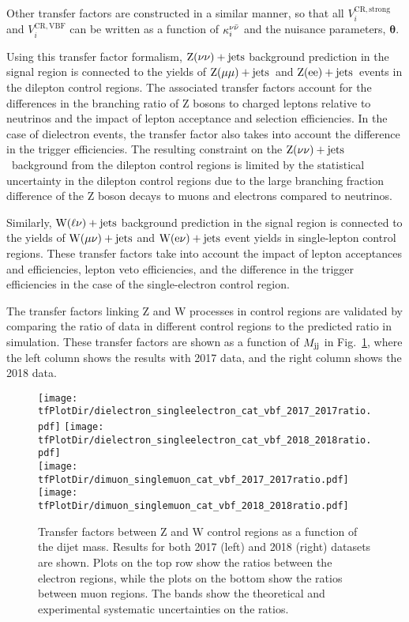 Other transfer factors are constructed in a similar manner, so that all $V_{i}^{\mathrm{CR,strong}}$ and
$V_{i}^{\mathrm{CR,VBF}}$ can be written as a function of $\kappa_{i}^{\nu\bar{\nu}}$ and the nuisance parameters, $\boldsymbol{\theta}$. 

Using this transfer factor formalism, $\textrm{Z}(\nu\nu)+\textrm{jets}$ background prediction in the signal region is connected 
to the yields of $\mathrm{Z}(\mu\mu)+\textrm{jets}$~and $\mathrm{Z}(\textrm{ee})+\textrm{jets}$~events
in the dilepton control regions. The associated transfer factors account for the differences in the
branching ratio of Z bosons to charged leptons relative to neutrinos and the impact of lepton acceptance and selection
efficiencies. In the case of dielectron events, the transfer factor also takes into account the
difference in the trigger efficiencies. The resulting constraint on the $\textrm{Z}(\nu\nu)+\textrm{jets}$~background from the dilepton
control regions is limited by the statistical uncertainty in the dilepton control regions due to the large
branching fraction difference of the Z boson decays to muons and electrons compared to neutrinos.

Similarly, $\textrm{W}(\ell\nu)+\textrm{jets}$ background prediction in the signal region is connected to the yields of
$\textrm{W}(\mu\nu)+\textrm{jets}$ and $\textrm{W}(\textrm{e}\nu)+\textrm{jets}$ event yields in single-lepton control regions.
These transfer factors take into account
the impact of lepton acceptances and efficiencies, lepton veto efficiencies, and
the difference in the trigger efficiencies in the case of the single-electron control region.

The transfer factors linking Z and W processes in control regions are validated by comparing the ratio of data in
different control regions to the predicted ratio in simulation. These transfer factors are shown as a function of $M_{\textrm{jj}}$
in Fig.~\ref{fig:transfer_factors_zoverw}, where the left column shows the results with 2017 data, and the right column
shows the 2018 data. 

\begin{figure}[htbp]
  \centering
    \texttt{[image: \\tfPlotDir/dielectron\_singleelectron\_cat\_vbf\_2017\_2017ratio.pdf]}
    \texttt{[image: \\tfPlotDir/dielectron\_singleelectron\_cat\_vbf\_2018\_2018ratio.pdf]} \\
    \texttt{[image: \\tfPlotDir/dimuon\_singlemuon\_cat\_vbf\_2017\_2017ratio.pdf]}
    \texttt{[image: \\tfPlotDir/dimuon\_singlemuon\_cat\_vbf\_2018\_2018ratio.pdf]}
  \caption{Transfer factors between Z and W control regions as a function of the dijet 
    mass. Results for both 2017 (left) and 2018 (right) datasets are shown. Plots on the top row show the ratios
    between the electron regions, while the plots on the bottom show the ratios between muon regions. 
    The bands show the theoretical and experimental systematic uncertainties on the ratios.}
    \label{fig:transfer_factors_zoverw}
\end{figure}

